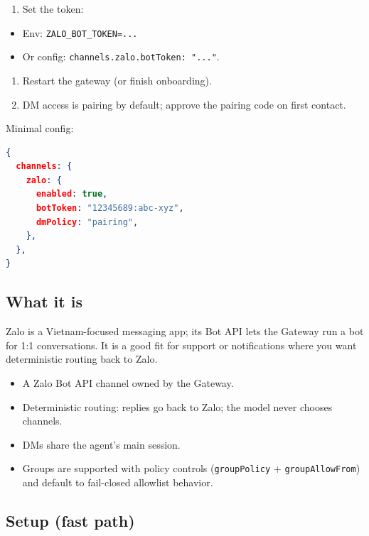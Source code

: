 \begin{enumerate}
  \item Set the token:
\end{enumerate}

\begin{itemize}
  \item Env: \texttt{ZALO\_BOT\_TOKEN=...}
  \item Or config: \texttt{channels.zalo.botToken: "..."}.
\end{itemize}

\begin{enumerate}
  \item Restart the gateway (or finish onboarding).
  \item DM access is pairing by default; approve the pairing code on first contact.
\end{enumerate}


Minimal config:

\begin{lstlisting}[language=json]
{
  channels: {
    zalo: {
      enabled: true,
      botToken: "12345689:abc-xyz",
      dmPolicy: "pairing",
    },
  },
}
\end{lstlisting}


\subsection{What it is}


Zalo is a Vietnam-focused messaging app; its Bot API lets the Gateway run a bot for 1:1 conversations.
It is a good fit for support or notifications where you want deterministic routing back to Zalo.

\begin{itemize}
  \item A Zalo Bot API channel owned by the Gateway.
  \item Deterministic routing: replies go back to Zalo; the model never chooses channels.
  \item DMs share the agent's main session.
  \item Groups are supported with policy controls (\texttt{groupPolicy} + \texttt{groupAllowFrom}) and default to fail-closed allowlist behavior.
\end{itemize}


\subsection{Setup (fast path)}


